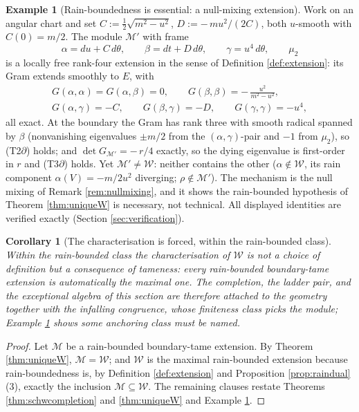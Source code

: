\documentclass[11pt]{article}
\newtheorem{corollary}[theorem]{Corollary}
\theoremstyle{definition}
\newtheorem{example}[theorem]{Example}
\newcommand{\shW}{\mathcal{W}}
\newcommand{\dtPG}{dt}
\begin{document}
\begin{example}[Rain-boundedness is essential: a null-mixing extension]\label{ex:nullmix}
Work on an angular chart and set $C := \tfrac12\sqrt{m^2 - u^2}$, $D := -\,m u^2/(2C)$, both $u$-smooth with $C(0) = m/2$. The module $\mathcal{M}'$ with frame
\[
\alpha = du + C\,d\theta, \qquad \beta = \dtPG + D\,d\theta, \qquad \gamma = u^4\,d\theta, \qquad \mu_2
\]
is a locally free rank-four extension in the sense of Definition \ref{def:extension}: its Gram extends smoothly to $E$, with
\[
\begin{gathered} G(\alpha,\alpha) = G(\alpha,\beta) = 0, \qquad G(\beta,\beta) = -\,\frac{u^2}{m^2 - u^2}, \\ G(\alpha,\gamma) = -C, \qquad G(\beta,\gamma) = -D, \qquad G(\gamma,\gamma) = -u^4 , \end{gathered}
\]
all exact. At the boundary the Gram has rank three with smooth radical spanned by $\beta$ (nonvanishing eigenvalues $\pm m/2$ from the $(\alpha,\gamma)$-pair and $-1$ from $\mu_2$), so (T2$\partial$) holds; and $\det G_{\mathcal{M}'} = -\,r/4$ exactly, so the dying eigenvalue is first-order in $r$ and (T3$\partial$) holds. Yet $\mathcal{M}' \neq \shW$: neither contains the other ($\alpha \notin \shW$, its rain component $\alpha(V) = -m/2u^2$ diverging; $\rho \notin \mathcal{M}'$). The mechanism is the null mixing of Remark \ref{rem:nullmixing}, and it shows the rain-bounded hypothesis of Theorem \ref{thm:uniqueW} is necessary, not technical. All displayed identities are verified exactly (Section \ref{sec:verification}).
\end{example}

\begin{corollary}[The characterisation is forced, within the rain-bounded class]\label{cor:forcedchar}
Within the rain-bounded class the characterisation of $\shW$ is not a choice of definition but a consequence of tameness: every rain-bounded boundary-tame extension is automatically the maximal one. The completion, the ladder pair, and the exceptional algebra of this section are therefore attached to the geometry together with the infalling congruence, whose finiteness class picks the module; Example \ref{ex:nullmix} shows some anchoring class must be named.
\end{corollary}

\begin{proof}
Let $\mathcal{M}$ be a rain-bounded boundary-tame extension. By Theorem \ref{thm:uniqueW}, $\mathcal{M} = \shW$; and $\shW$ is the maximal rain-bounded extension because rain-boundedness is, by Definition \ref{def:extension} and Proposition \ref{prop:raindual}(3), exactly the inclusion $\mathcal{M} \subseteq \shW$. The remaining clauses restate Theorems \ref{thm:schwcompletion} and \ref{thm:uniqueW} and Example \ref{ex:nullmix}.
\end{proof}
\end{document}
